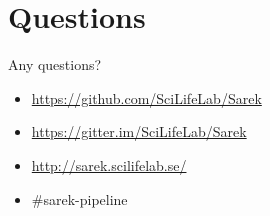 \documentclass[usepdftitle=false]{beamer}
\begin{document}
{
	\section{Questions}
	\begin{frame}[plain]{Any questions?}
		\vspace{-5.5cm}
		\begin{itemize}
			\item[\faGithub] \url{https://github.com/SciLifeLab/Sarek}
			\item[\faGitter] \url{https://gitter.im/SciLifeLab/Sarek}
			\item[\faGlobe] \url{http://sarek.scilifelab.se/}
			\item[\faSlack] \#sarek-pipeline
		\end{itemize}
	\end{frame}
}
\end{document}
